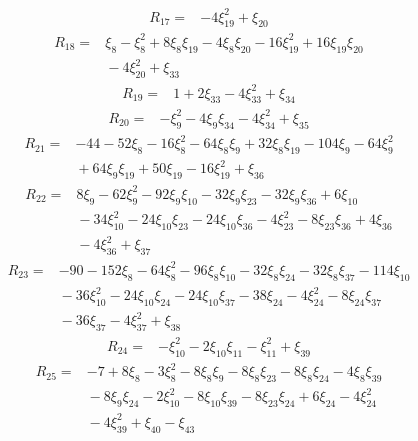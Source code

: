 \[
\begin{aligned}
 R_{17}={}&-4\xi_{19}^{2}+\xi_{20}
\end{aligned}
\]
\[
\begin{aligned}
 R_{18}={}&\xi_{8}-\xi_{8}^{2}+8\xi_{8}\xi_{19}-4\xi_{8}\xi_{20}-16\xi_{19}^{2}+16\xi_{19}\xi_{20}\\
 &{}-4\xi_{20}^{2}+\xi_{33}
\end{aligned}
\]
\[
\begin{aligned}
 R_{19}={}&1+2\xi_{33}-4\xi_{33}^{2}+\xi_{34}
\end{aligned}
\]
\[
\begin{aligned}
 R_{20}={}&-\xi_{9}^{2}-4\xi_{9}\xi_{34}-4\xi_{34}^{2}+\xi_{35}
\end{aligned}
\]
\[
\begin{aligned}
 R_{21}={}&-44-52\xi_{8}-16\xi_{8}^{2}-64\xi_{8}\xi_{9}+32\xi_{8}\xi_{19}-104\xi_{9}-64\xi_{9}^{2}\\
 &{}+64\xi_{9}\xi_{19}+50\xi_{19}-16\xi_{19}^{2}+\xi_{36}
\end{aligned}
\]
\[
\begin{aligned}
 R_{22}={}&8\xi_{9}-62\xi_{9}^{2}-92\xi_{9}\xi_{10}-32\xi_{9}\xi_{23}-32\xi_{9}\xi_{36}+6\xi_{10}\\
 &{}-34\xi_{10}^{2}-24\xi_{10}\xi_{23}-24\xi_{10}\xi_{36}-4\xi_{23}^{2}-8\xi_{23}\xi_{36}+4\xi_{36}\\
 &{}-4\xi_{36}^{2}+\xi_{37}
\end{aligned}
\]
\[
\begin{aligned}
 R_{23}={}&-90-152\xi_{8}-64\xi_{8}^{2}-96\xi_{8}\xi_{10}-32\xi_{8}\xi_{24}-32\xi_{8}\xi_{37}-114\xi_{10}\\
 &{}-36\xi_{10}^{2}-24\xi_{10}\xi_{24}-24\xi_{10}\xi_{37}-38\xi_{24}-4\xi_{24}^{2}-8\xi_{24}\xi_{37}\\
 &{}-36\xi_{37}-4\xi_{37}^{2}+\xi_{38}
\end{aligned}
\]
\[
\begin{aligned}
 R_{24}={}&-\xi_{10}^{2}-2\xi_{10}\xi_{11}-\xi_{11}^{2}+\xi_{39}
\end{aligned}
\]
\[
\begin{aligned}
 R_{25}={}&-7+8\xi_{8}-3\xi_{8}^{2}-8\xi_{8}\xi_{9}-8\xi_{8}\xi_{23}-8\xi_{8}\xi_{24}-4\xi_{8}\xi_{39}\\
 &{}-8\xi_{9}\xi_{24}-2\xi_{10}^{2}-8\xi_{10}\xi_{39}-8\xi_{23}\xi_{24}+6\xi_{24}-4\xi_{24}^{2}\\
 &{}-4\xi_{39}^{2}+\xi_{40}-\xi_{43}
\end{aligned}
\]
